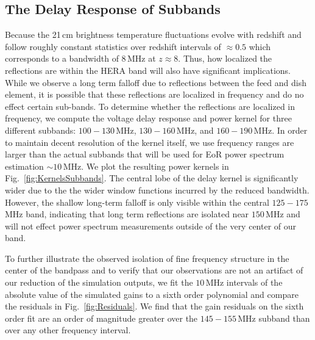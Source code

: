 \documentclass[twocolumn]{emulateapj}
\begin{document}
\subsection{The Delay Response of Subbands}\label{ssec:Subbands}
Because the 21\,cm brightness temperature fluctuations evolve with redshift and follow roughly constant statistics over redshift intervals of $\approx 0.5$ \citep{Zaldarriaga:2004} which corresponds to a bandwidth of $8$\,MHz at $z\approx8$. Thus, how localized the reflections are within the HERA band will also have significant implications. While we observe a long term falloff due to reflections between the feed and dish element, it is possible that these reflections are localized in frequency and do no effect certain sub-bands. To determine whether the reflections are localized in frequency, we compute the voltage delay response and power kernel for three different subbands: $100-130$\,MHz, $130-160$\,MHz, and $160-190$\,MHz. In order to maintain decent resolution of the kernel itself, we use frequency ranges are larger than the actual subbands that will be used for EoR power spectrum estimation $\sim 10$\,MHz. We plot the resulting power kernels in Fig.~\ref{fig:KernelsSubbands}. The central lobe of the delay kernel is significantly wider due to the the wider window functions incurred by the reduced bandwidth. However, the shallow long-term falloff is only visible within the central $125-175$\,MHz band, indicating that long term reflections are isolated near $150$\,MHz and will not effect power spectrum measurements outside of the very center of our band.

To further illustrate the observed isolation of fine frequency structure in the center of the bandpass and to verify that our observations are not an artifact of our reduction of the simulation outputs, we fit the $10$\,MHz intervals of the absolute value of the simulated gains to a sixth order polynomial and compare the residuals in Fig.~\ref{fig:Residuals}. We find that the gain residuals on the sixth order fit are an order of magnitude greater over the $145-155$\,MHz subband than over any other frequency interval. 
\end{document}
